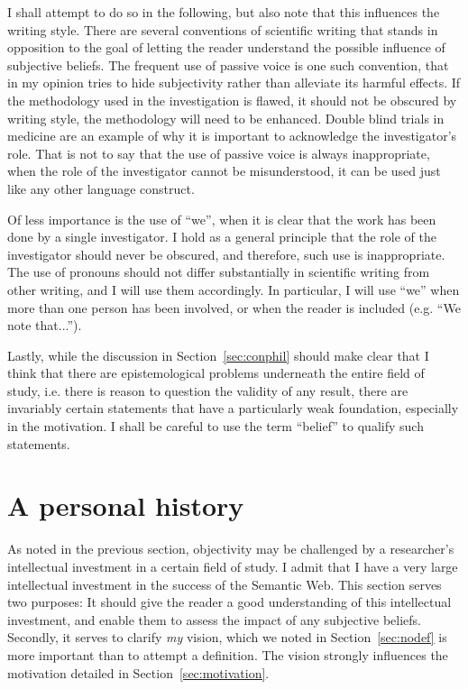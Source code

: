 I shall attempt to do so in the following, but also note that this
influences the writing style. There are several conventions of
scientific writing that stands in opposition to the goal of letting
the reader understand the possible influence of subjective
beliefs. The frequent use of passive voice is one such convention,
that in my opinion tries to hide subjectivity rather than alleviate
its harmful effects. If the methodology used in the investigation is
flawed, it should not be obscured by writing style, the methodology
will need to be enhanced. Double blind trials in medicine are an
example of why it is important to acknowledge the investigator's
role. That is not to say that the use of passive voice is always
inappropriate, when the role of the investigator cannot be
misunderstood, it can be used just like any other language construct.

Of less importance is the use of ``we'', when it is clear that the
work has been done by a single investigator. I hold as a general
principle that the role of the investigator should never be obscured,
and therefore, such use is inappropriate. The use of pronouns should
not differ substantially in scientific writing from other writing, and
I will use them accordingly. In particular, I will use ``we'' when
more than one person has been involved, or when the reader is included
(e.g. ``We note that...'').

Lastly, while the discussion in Section~\ref{sec:conphil} should make
clear that I think that there are epistemological problems underneath
the entire field of study, i.e. there is reason to question the
validity of any result, there are invariably certain statements that
have a particularly weak foundation, especially in the motivation. I
shall be careful to use the term ``belief'' to qualify such
statements.

\section{A personal history}\label{sec:history}

As noted in the previous section, objectivity may be challenged by a
researcher's intellectual investment in a certain field of study. I
admit that I have a very large intellectual investment in the success
of the Semantic Web. This section serves two purposes: It should give
the reader a good understanding of this intellectual investment, and
enable them to assess the impact of any subjective beliefs. Secondly,
it serves to clarify \emph{my} vision, which we noted in
Section~\ref{sec:nodef} is more important than to attempt a
definition. The vision strongly influences the motivation detailed in
Section~\ref{sec:motivation}.


